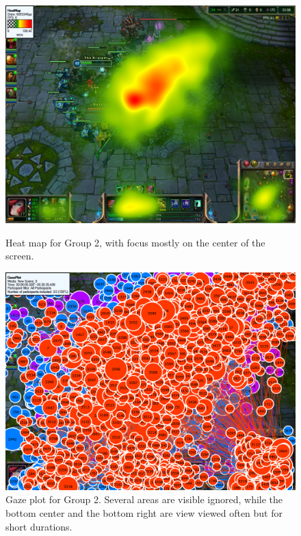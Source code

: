 \documentclass{report}
\begin{document}
\begin{figure}[!ht]
\begin{minipage}[t]{0.45\linewidth}
\centering
\includegraphics[width=\textwidth]{images/heatmap/Pros}
\caption{Heat map for Group 2, with focus mostly on the center of the screen.}
\label{heat_pro}
\end{minipage}
\hspace{0.5cm}
\begin{minipage}[t]{0.45\linewidth}
\centering
\includegraphics[width=\textwidth]{images/gazeplot/Pros}
\caption{Gaze plot for Group 2. Several areas are visible ignored, while the bottom center and the bottom right are view viewed often but for short durations.}
\label{gaze_pro}
\end{minipage}
\end{figure}
\end{document}
